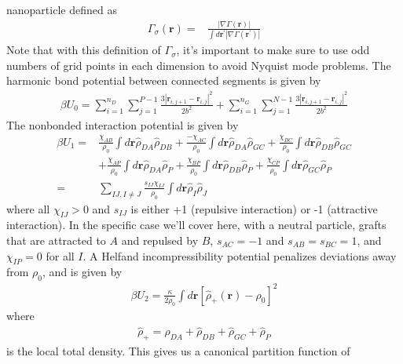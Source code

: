 \documentclass{article}
\begin{document}
  nanoparticle defined as
\begin{align*}
  \Gamma_\sigma(\mathbf{r}) =&
    \frac{| \nabla \Gamma(\mathbf{r}) |}
         {\int d \mathbf{r^\prime} | \nabla \Gamma(\mathbf{r^\prime}) | }
\end{align*}
Note that with this definition of $\Gamma_\sigma$, it's important to make sure
  to use odd numbers of grid points in each dimension to avoid Nyquist mode
  problems.
The harmonic bond potential between connected segments is given by
\begin{align*}
  \beta U_0 =
    \sum_{i=1}^{n_D} \sum_{j=1}^{P-1}
    \frac{3 \left| \mathbf{r}_{i,j+1} - \mathbf{r}_{i,j} \right| ^ 2 }
         { 2 b^2 }
    +
    \sum_{i=1}^{n_G} \sum_{j=1}^{N-1}
    \frac{3 \left| \mathbf{r}_{i,j+1} - \mathbf{r}_{i,j} \right| ^ 2 }
         { 2 b^2 }
\end{align*}
The nonbonded interaction potential is given by
\begin{align*}
  \beta U_1 =&
    \frac{\chi_{AB}}{\rho_0} \int d\mathbf{r} \hat{\rho}_{DA} \hat{\rho}_{DB}
    + \frac{-\chi_{AC}}{\rho_0} \int d\mathbf{r} \hat{\rho}_{DA} \hat{\rho}_{GC}
    + \frac{\chi_{BC}}{\rho_0} \int d\mathbf{r} \hat{\rho}_{DB} \hat{\rho}_{GC}
    \\
    &+ \frac{\chi_{AP}}{\rho_0} \int d\mathbf{r} \hat{\rho}_{DA} \hat{\rho}_P
    + \frac{\chi_{BP}}{\rho_0} \int d\mathbf{r} \hat{\rho}_{DB} \hat{\rho}_P
    + \frac{\chi_{CP}}{\rho_0} \int d\mathbf{r} \hat{\rho}_{GC} \hat{\rho}_P \\
  =&
    \sum_{IJ, I \ne J} \frac{s_{IJ}\chi_{IJ}}{\rho_0}
    \int d \mathbf{r} \hat{\rho}_I \hat{\rho}_J
\end{align*}
where all $\chi_{IJ} > 0$ and $s_{IJ}$ is either +1 (repulsive interaction) or
  -1 (attractive interaction).
In the specific case we'll cover here, with a neutral particle, grafts that
  are attracted to $A$ and repulsed by $B$, $s_{AC} = -1$ and
  $s_{AB} = s_{BC} = 1$, and $\chi_{IP} = 0$ for all $I$.
A Helfand incompressibility potential penalizes deviations away from $\rho_0$,
  and is given by
\begin{align*}
  \beta U_2 = \frac{\kappa}{2 \rho_0} \int d \mathbf{r}
    \left[ \hat{\rho}_+ (\mathbf{r}) - \rho_0 \right] ^ 2
\end{align*}
where
\begin{align*}
  \hat{\rho}_+ =
    \hat{\rho}_{DA} + \hat{\rho}_{DB} + \hat{\rho}_{GC} + \hat{\rho}_P
\end{align*}
  is the local total density.
This gives us a canonical partition function of
\end{document}
